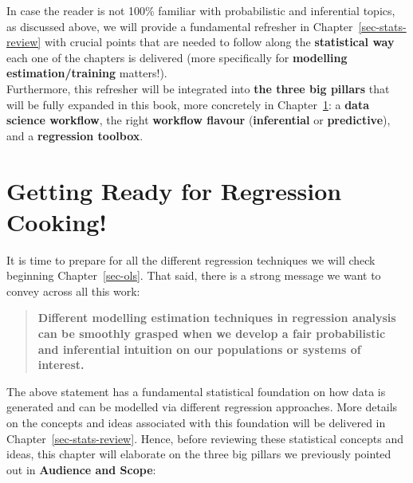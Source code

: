 \documentclass[
  letterpaper,
  DIV=11,
  numbers=noendperiod]{scrreprt}
\begin{document}
\begin{tcolorbox}[enhanced jigsaw, bottomrule=.15mm, breakable, colback=white, leftrule=.75mm, coltitle=black, rightrule=.15mm, bottomtitle=1mm, title={A further remark on probability and statistical inference}, opacitybacktitle=0.6, toprule=.15mm, titlerule=0mm, arc=.35mm, colbacktitle=quarto-callout-note-color!10!white, toptitle=1mm, colframe=quarto-callout-note-color-frame, left=2mm, opacityback=0]

In case the reader is not 100\% familiar with probabilistic and
inferential topics, as discussed above, we will provide a fundamental
refresher in Chapter~\ref{sec-stats-review} with crucial points that are
needed to follow along the \textbf{statistical way} each one of the
chapters is delivered (more specifically for \textbf{modelling
estimation/training} matters!).\\

Furthermore, this refresher will be integrated into \textbf{the three
big pillars} that will be fully expanded in this book, more concretely
in Chapter~\ref{sec-intro}: a \textbf{data science workflow}, the right
\textbf{workflow flavour} (\textbf{inferential} or \textbf{predictive}),
and a \textbf{regression toolbox}.

\end{tcolorbox}


\chapter{Getting Ready for Regression Cooking!}\label{sec-intro}

It is time to prepare for all the different regression techniques we
will check beginning Chapter~\ref{sec-ols}. That said, there is a strong
message we want to convey across all this work:

\begin{quote}
\textbf{Different modelling estimation techniques in regression analysis
can be smoothly grasped when we develop a fair probabilistic and
inferential intuition on our populations or systems of interest.}
\end{quote}

The above statement has a fundamental statistical foundation on how data
is generated and can be modelled via different regression approaches.
More details on the concepts and ideas associated with this foundation
will be delivered in Chapter~\ref{sec-stats-review}. Hence, before
reviewing these statistical concepts and ideas, this chapter will
elaborate on the three big pillars we previously pointed out in
\textbf{Audience and Scope}:
\end{document}
